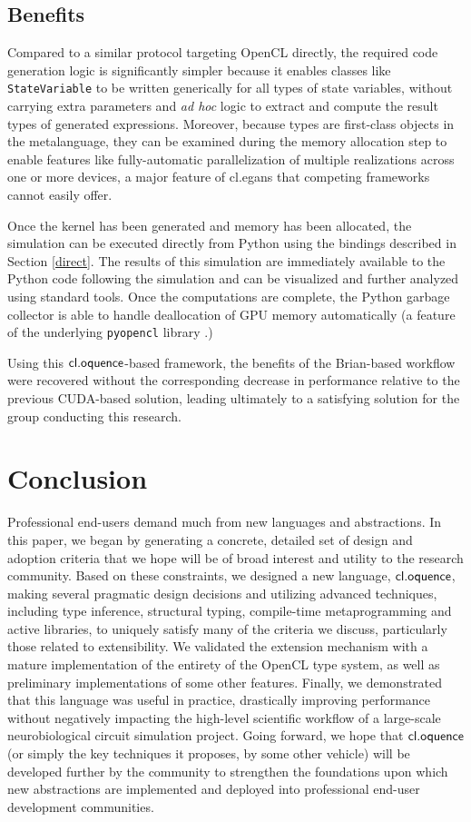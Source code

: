 \documentclass{llncs}
\begin{document}
\subsection{Benefits}
Compared to a similar protocol targeting OpenCL directly, the required code generation logic is significantly simpler because it enables classes like \verb|StateVariable| to be written generically for all types of state variables, without carrying extra parameters and {\it ad hoc} logic to extract and compute the result types of generated expressions. Moreover, because types are first-class objects in the metalanguage, they can be examined during the memory allocation step to enable features like fully-automatic parallelization of multiple realizations across one or more devices, a major feature of {\sf cl.egans} that competing frameworks cannot easily offer.

Once the kernel has been generated and memory has been allocated, the simulation can be executed directly from Python using the bindings described in Section \ref{direct}. The results of this simulation are immediately available to the Python code following the simulation and can be visualized and further analyzed using standard tools. Once the computations are complete, the Python garbage collector is able to handle deallocation of GPU memory automatically (a feature of the underlying \verb|pyopencl| library \cite{klockner2011pycuda}.)

Using this $\textsf{cl.oquence}$-based framework, the benefits of the Brian-based workflow were recovered without the  corresponding decrease in performance relative to the previous CUDA-based solution, leading ultimately to a satisfying solution for the group conducting this research.

\section{Conclusion}
Professional end-users demand much from new languages and abstractions. In this paper, we began by generating a concrete, detailed set of design and adoption criteria that we hope will be of broad interest and utility to the research community. Based on these constraints, we designed a new language, $\textsf{cl.oquence}$, making several pragmatic design decisions and utilizing advanced techniques, including type inference, structural typing, compile-time metaprogramming and active libraries, to uniquely satisfy many of the criteria we discuss, particularly those related to extensibility. We validated the extension mechanism with a mature implementation of  the entirety of the OpenCL type system, as well as preliminary implementations of some other features. Finally, we demonstrated that this language was useful in practice, drastically improving performance without negatively impacting the high-level scientific workflow of a large-scale neurobiological circuit simulation project. Going forward, we hope that $\textsf{cl.oquence}$ (or simply the key techniques it proposes, by some other vehicle) will be developed further by the community to strengthen the foundations upon which new abstractions are implemented and deployed into professional end-user development communities.
\end{document}
